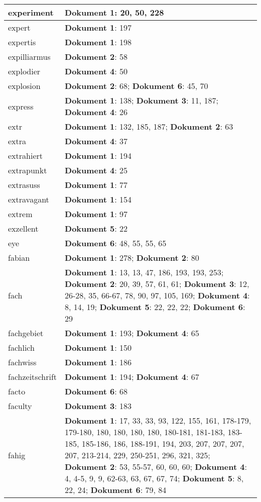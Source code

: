\documentclass[a5paper]{article}
\begin{document}
\begin{longtable}[l]{|l|p{3in}|}
\hline
experiment & \textbf{Dokument 1}: 20, 50, 228 \\
\hline
expert & \textbf{Dokument 1}: 197 \\
\hline
expertis & \textbf{Dokument 1}: 198 \\
\hline
expilliarmus & \textbf{Dokument 2}: 58 \\
\hline
explodier & \textbf{Dokument 4}: 50 \\
\hline
explosion & \textbf{Dokument 2}: 68; \textbf{Dokument 6}: 45, 70 \\
\hline
express & \textbf{Dokument 1}: 138; \textbf{Dokument 3}: 11, 187; \textbf{Dokument 4}: 26 \\
\hline
extr & \textbf{Dokument 1}: 132, 185, 187; \textbf{Dokument 2}: 63 \\
\hline
extra & \textbf{Dokument 4}: 37 \\
\hline
extrahiert & \textbf{Dokument 1}: 194 \\
\hline
extrapunkt & \textbf{Dokument 4}: 25 \\
\hline
extrasuss & \textbf{Dokument 1}: 77 \\
\hline
extravagant & \textbf{Dokument 1}: 154 \\
\hline
extrem & \textbf{Dokument 1}: 97 \\
\hline
exzellent & \textbf{Dokument 5}: 22 \\
\hline
eye & \textbf{Dokument 6}: 48, 55, 55, 65 \\
\hline
fabian & \textbf{Dokument 1}: 278; \textbf{Dokument 2}: 80 \\
\hline
fach & \textbf{Dokument 1}: 13, 13, 47, 186, 193, 193, 253; \textbf{Dokument 2}: 20, 39, 57, 61, 61; \textbf{Dokument 3}: 12, 26-28, 35, 66-67, 78, 90, 97, 105, 169; \textbf{Dokument 4}: 8, 14, 19; \textbf{Dokument 5}: 22, 22, 22; \textbf{Dokument 6}: 29 \\
\hline
fachgebiet & \textbf{Dokument 1}: 193; \textbf{Dokument 4}: 65 \\
\hline
fachlich & \textbf{Dokument 1}: 150 \\
\hline
fachwiss & \textbf{Dokument 1}: 186 \\
\hline
fachzeitschrift & \textbf{Dokument 1}: 194; \textbf{Dokument 4}: 67 \\
\hline
facto & \textbf{Dokument 6}: 68 \\
\hline
faculty & \textbf{Dokument 3}: 183 \\
\hline
fahig & \textbf{Dokument 1}: 17, 33, 33, 93, 122, 155, 161, 178-179, 179-180, 180, 180, 180, 180, 180-181, 181-183, 183-185, 185-186, 186, 188-191, 194, 203, 207, 207, 207, 207, 213-214, 229, 250-251, 296, 321, 325; \textbf{Dokument 2}: 53, 55-57, 60, 60, 60; \textbf{Dokument 4}: 4, 4-5, 9, 9, 62-63, 63, 67, 67, 74; \textbf{Dokument 5}: 8, 22, 24; \textbf{Dokument 6}: 79, 84 \\

\end{longtable}
\end{document}
